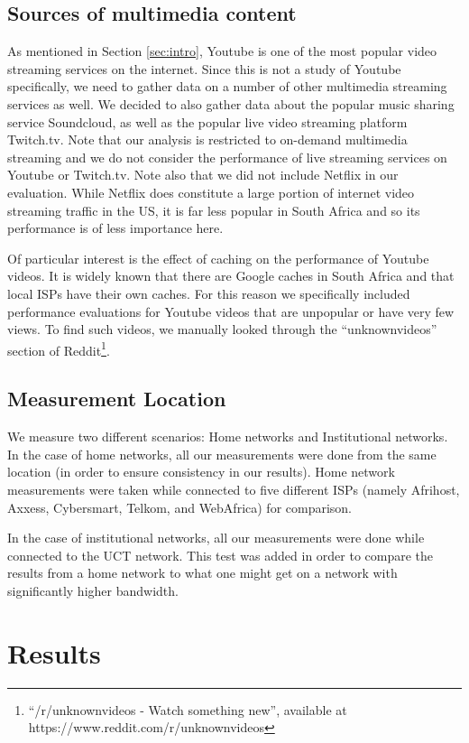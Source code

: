 \documentclass{sig-alternate-05-2015}
\begin{document}
\subsection{Sources of multimedia content}
As mentioned in Section \ref{sec:intro}, Youtube is one of the most popular video streaming services on the internet. Since this is not a study of Youtube specifically, we need to gather data on a number of other multimedia streaming services as well. We decided to also gather data about the popular music sharing service Soundcloud, as well as the popular live video streaming platform Twitch.tv. Note that our analysis is restricted to on-demand multimedia streaming and we do not consider the performance of live streaming services on Youtube or Twitch.tv. Note also that we did not include Netflix in our evaluation. While Netflix does constitute a large portion of internet video streaming traffic in the US, it is far less popular in South Africa and so its performance is of less importance here.

Of particular interest is the effect of caching on the performance of Youtube videos. It is widely known that there are Google caches in South Africa and that local ISPs have their own caches. For this reason we specifically included performance evaluations for Youtube videos that are unpopular or have very few views. To find such videos, we manually looked through the ``unknownvideos'' section of Reddit\footnote{``/r/unknownvideos - Watch something new'', available at https://www.reddit.com/r/unknownvideos}.

\subsection{Measurement Location}
We measure two different scenarios: Home networks and Institutional networks. In the case of home networks, all our measurements were done from the same location (in order to ensure consistency in our results). Home network measurements were taken while connected to five different ISPs (namely Afrihost, Axxess, Cybersmart, Telkom, and WebAfrica) for comparison.

In the case of institutional networks, all our measurements were done while connected to the UCT network. This test was added in order to compare the results from a home network to what one might get on a network with significantly higher bandwidth.

\section{Results}\label{sec:results}
\end{document}
